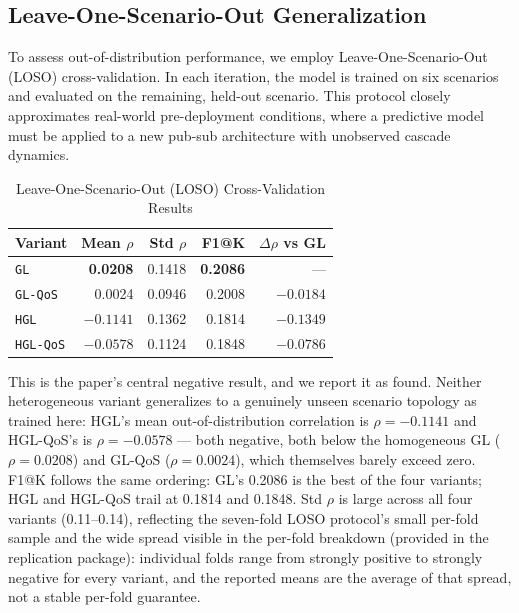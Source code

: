 \documentclass[review]{elsarticle}
\begin{document}
\subsection{Leave-One-Scenario-Out Generalization}

To assess out-of-distribution performance, we employ Leave-One-Scenario-Out (LOSO) cross-validation.
In each iteration, the model is trained on six scenarios and evaluated on the remaining, held-out
scenario. This protocol closely approximates real-world pre-deployment conditions, where a
predictive model must be applied to a new pub-sub architecture with unobserved cascade dynamics.

\begin{table}[htbp]
\centering
\caption{Leave-One-Scenario-Out (LOSO) Cross-Validation Results}
\label{tab:loso}
\begin{tabular}{@{}lrrrr@{}}
\toprule
Variant & Mean $\rho$ & Std $\rho$ & F1@K & $\Delta\rho$ vs GL \\
\midrule
\texttt{GL} & \textbf{0.0208} & 0.1418 & \textbf{0.2086} & --- \\
\texttt{GL-QoS} & 0.0024 & 0.0946 & 0.2008 & $-0.0184$ \\
\texttt{HGL} & $-0.1141$ & 0.1362 & 0.1814 & $-0.1349$ \\
\texttt{HGL-QoS} & $-0.0578$ & 0.1124 & 0.1848 & $-0.0786$ \\
\bottomrule
\end{tabular}
\end{table}

This is the paper's central negative result, and we report it as found. Neither heterogeneous
variant generalizes to a genuinely unseen scenario topology as trained here: HGL's mean
out-of-distribution correlation is $\rho=-0.1141$ and HGL-QoS's is $\rho=-0.0578$ --- both negative,
both below the homogeneous GL ($\rho=0.0208$) and GL-QoS ($\rho=0.0024$), which themselves barely
exceed zero. F1@K follows the same ordering: GL's 0.2086 is the best of the four variants; HGL and
HGL-QoS trail at 0.1814 and 0.1848. Std $\rho$ is large across all four variants (0.11--0.14),
reflecting the seven-fold LOSO protocol's small per-fold sample and the wide spread visible in the
per-fold breakdown (provided in the replication package): individual folds range from strongly
positive to strongly negative for every variant, and the reported means are the average of that
spread, not a stable per-fold guarantee.
\end{document}
